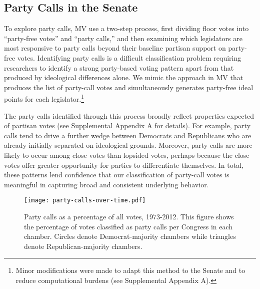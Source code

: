 \documentclass[12pt]{article}
\begin{document}
\subsection*{Party Calls in the Senate}

To explore party calls, MV use a two-step process, first dividing floor votes into ``party-free votes'' and ``party calls,'' and then examining which legislators are most responsive to party calls beyond their baseline partisan support on party-free votes.  Identifying party calls is a difficult classification problem requiring researchers to identify a strong party-based voting pattern apart from that produced by ideological differences alone.  We mimic the approach in MV that produces the list of party-call votes and simultaneously generates party-free ideal points for each legislator.\footnote{\doublespacing\normalsize Minor modifications were made to adapt this method to the Senate and to reduce computational burdens (see Supplemental Appendix A).}

The party calls identified through this process broadly reflect properties expected of partisan votes (see Supplemental Appendix A for details).  For example, party calls tend to drive a further wedge between Democrats and Republicans who are already initially separated on ideological grounds.  Moreover, party calls are more likely to occur among close votes than lopsided votes, perhaps because the close votes offer greater opportunity for parties to differentiate themselves.  In total, these patterns lend confidence that our classification of party-call votes is meaningful in capturing broad and consistent underlying behavior.

\begin{figure}[t]
\centering
\texttt{[image: party-calls-over-time.pdf]}
\caption{Party calls as a percentage of all votes, 1973-2012.
This figure shows the percentage of votes classified as party calls per Congress in each chamber. Circles denote Democrat-majority chambers while triangles denote Republican-majority chambers.
\label{fig-party-calls-over-time}}
\end{figure}
\end{document}
